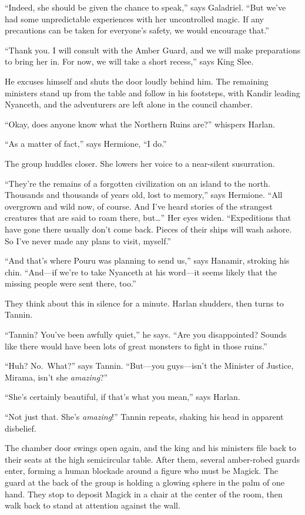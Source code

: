 \documentclass[smalldemyvopaper,11pt,twoside,onecolumn,openright,extrafontsizes]{memoir}
\begin{document}
``Indeed, she should be given the chance to speak,'' says Galadriel.
``But we've had some unpredictable experiences with her uncontrolled
magic. If any precautions can be taken for everyone's safety, we would
encourage that.''

``Thank you. I will consult with the Amber Guard, and we will make
preparations to bring her in. For now, we will take a short recess,''
says King Slee.

He excuses himself and shuts the door loudly behind him. The remaining
ministers stand up from the table and follow in his footsteps, with
Kandir leading Nyanceth, and the adventurers are left alone in the
council chamber.

``Okay, does anyone know what the Northern Ruins are?'' whispers Harlan.

``As a matter of fact,'' says Hermione, ``I do.''

The group huddles closer. She lowers her voice to a near-silent
susurration.

``They're the remains of a forgotten civilization on an island to the
north. Thousands and thousands of years old, lost to memory,'' says
Hermione. ``All overgrown and wild now, of course. And I've heard
stories of the strangest creatures that are said to roam there,
but\ldots{}'' Her eyes widen. ``Expeditions that have gone there usually
don't come back. Pieces of their ships will wash ashore. So I've never
made any plans to visit, myself.''

``And that's where Pouru was planning to send us,'' says Hanamir,
stroking his chin. ``And---if we're to take Nyanceth at his word---it
seems likely that the missing people were sent there, too.''

They think about this in silence for a minute. Harlan shudders, then
turns to Tannin.

``Tannin? You've been awfully quiet,'' he says. ``Are you disappointed?
Sounds like there would have been lots of great monsters to fight in
those ruins.''

``Huh? No.~What?'' says Tannin. ``But---you guys---isn't the Minister of
Justice, Mirama, isn't she \emph{amazing}?''

``She's certainly beautiful, if that's what you mean,'' says Harlan.

``Not just that. She's \emph{amazing}!'' Tannin repeats, shaking his
head in apparent disbelief.

The chamber door swings open again, and the king and his ministers file
back to their seats at the high semicircular table. After them, several
amber-robed guards enter, forming a human blockade around a figure who
must be Magick. The guard at the back of the group is holding a glowing
sphere in the palm of one hand. They stop to deposit Magick in a chair
at the center of the room, then walk back to stand at attention against
the wall.
\end{document}
